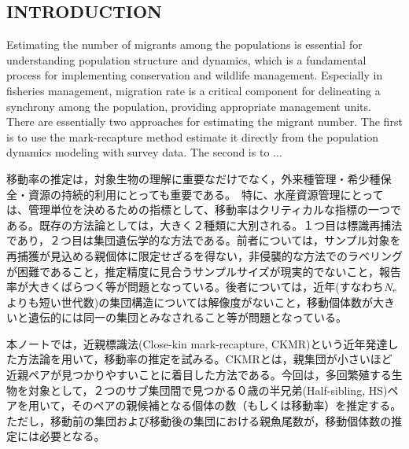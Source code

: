 \documentclass[12pt, English]{article}
\begin{document}
\pagebreak
\begin{spacing}{1.9}
\newcommand{\NeNbias}{S1}

\newcommand{\Nebias}{S2}

\newcommand{\Ninvbias}{S3}

\newcommand{\NeNcv}{S4}

\newcommand{\Necv}{S5}

\newcommand{\Ninvcv}{S6}

\section{INTRODUCTION}

Estimating the number of migrants among the populations is essential for understanding population structure and dynamics, which is a fundamental process for implementing conservation and wildlife management. Especially in fisheries management, migration rate is a critical component for delineating a synchrony among the population, providing appropriate management units. There are essentially two approaches for estimating the migrant number. The first is to use the mark-recapture method estimate it directly from the population dynamics modeling with survey data. The second is to ...

移動率の推定は，対象生物の理解に重要なだけでなく，外来種管理・希少種保全・資源の持続的利用にとっても重要である。　特に、水産資源管理にとっては、管理単位を決めるための指標として、移動率はクリティカルな指標の一つである。既存の方法論としては，大きく２種類に大別される。１つ目は標識再捕法であり，２つ目は集団遺伝学的な方法である。前者については，サンプル対象を再捕獲が見込める親個体に限定せざるを得ない，非侵襲的な方法でのラベリングが困難であること，推定精度に見合うサンプルサイズが現実的でないこと，報告率が大きくばらつく等が問題となっている。後者については，近年(すなわち$N_{\rm e}$よりも短い世代数)の集団構造については解像度がないこと，移動個体数が大きいと遺伝的には同一の集団とみなされること等が問題となっている。

本ノートでは，近親標識法(Close-kin mark-recapture, CKMR)という近年発達した方法論を用いて，移動率の推定を試みる。CKMRとは，親集団が小さいほど近親ペアが見つかりやすいことに着目した方法である。今回は，多回繁殖する生物を対象として，２つのサブ集団間で見つかる０歳の半兄弟(Half-sibling, HS)ペアを用いて，そのペアの親候補となる個体の数（もしくは移動率）を推定する。ただし，移動前の集団および移動後の集団における親魚尾数が，移動個体数の推定には必要となる。


\end{spacing}
\end{document}
